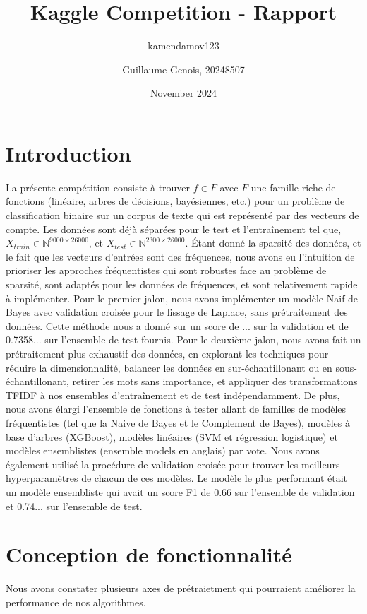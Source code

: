 \documentclass{article}
\title{Kaggle Competition - Rapport}
\author{kamendamov123 }
\author{Guillaume Genois, 20248507}
\date{November 2024}
\begin{document}
\maketitle

\section{Introduction}
La présente compétition consiste à trouver $f \in F$ avec $F$ une famille riche de fonctions (linéaire, arbres de décisions, bayésiennes, etc.) pour un problème de classification binaire sur un corpus de texte qui est représenté par des vecteurs de compte. Les données sont déjà séparées pour le test et l'entraînement tel que, $X_{train} \in \mathbb{N}^{9000 \times 26000}$, et $X_{test} \in \mathbb{N}^{2300 \times 26000}$. Étant donné la sparsité des données, et le fait que les vecteurs d'entrées sont des fréquences, nous avons eu l'intuition de prioriser les approches fréquentistes qui sont robustes face au problème de sparsité, sont adaptés pour les données de fréquences, et sont relativement rapide à implémenter. Pour le premier jalon, nous avons implémenter un modèle Naif de Bayes avec validation croisée pour le lissage de Laplace, sans prétraitement des données. Cette méthode nous a donné sur un score de ... sur la validation et de 0.7358... sur l'ensemble de test fournis. Pour le deuxième jalon, nous avons fait un prétraitement plus exhaustif des données, en explorant les techniques pour réduire la dimensionnalité, balancer les données en sur-échantillonant ou en sous-échantillonant, retirer les mots sans importance, et appliquer des transformations TFIDF à nos ensembles d'entraînement et de test indépendamment. De plus, nous avons élargi l'ensemble de fonctions à tester allant de familles de modèles fréquentistes (tel que la Naive de Bayes et le Complement de Bayes), modèles à base d'arbres (XGBoost), modèles linéaires (SVM et régression logistique) et modèles ensemblistes (ensemble models en anglais) par vote. Nous avons également utilisé la procédure de validation croisée pour trouver les meilleurs hyperparamètres de chacun de ces modèles. Le modèle le plus performant était un modèle ensembliste qui avait un score F1 de 0.66 sur l'ensemble de validation et 0.74... sur l'ensemble de test.

\section{Conception de fonctionnalité}
Nous avons constater plusieurs axes de prétraietment qui pourraient améliorer la performance de nos algorithmes.
\end{document}
